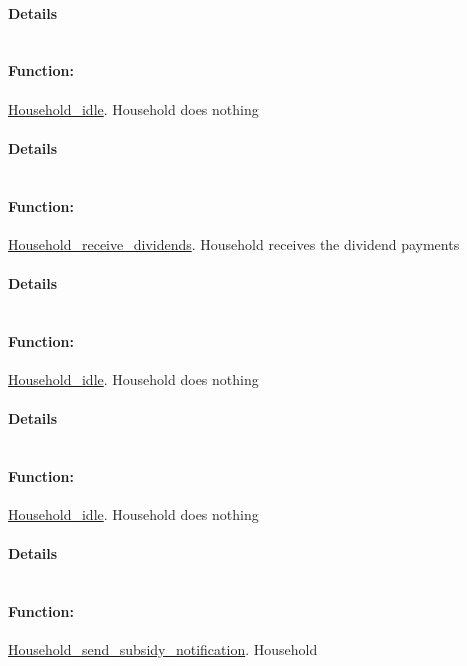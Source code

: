 \documentclass[a4paper,11pt]{article}
\begin{document}
\paragraph{Details}
\begin{verbatim}
\end{verbatim}
\paragraph{Function:}\url{Household_idle}.
Household does nothing
\paragraph{Details}
\begin{verbatim}
\end{verbatim}
\paragraph{Function:}\url{Household_receive_dividends}.
Household receives the dividend payments
\paragraph{Details}
\begin{verbatim}
\end{verbatim}
\paragraph{Function:}\url{Household_idle}.
Household does nothing
\paragraph{Details}
\begin{verbatim}
\end{verbatim}
\paragraph{Function:}\url{Household_idle}.
Household does nothing
\paragraph{Details}
\begin{verbatim}
\end{verbatim}
\paragraph{Function:}\url{Household_send_subsidy_notification}.
Household 
\end{document}
